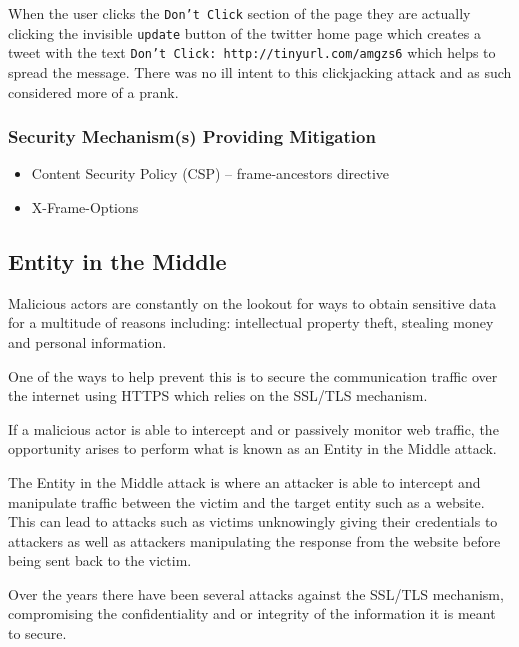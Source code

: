 \documentclass{mscreport}
\begin{document}
\vspace{0.3cm} \noindent
When the user clicks the \texttt{Don't Click} section of the page they are actually clicking the invisible \texttt{update} button of the twitter home page which creates a tweet with the text \texttt{Don’t Click: http://tinyurl.com/amgzs6} \cite{Jani2015-kw} which helps to spread the message. There was no ill intent to this clickjacking attack and as such considered more of a prank.
\subsubsection{Security Mechanism(s) Providing Mitigation}

\begin{itemize}
	\setlength\itemsep{0.1em}
	\item Content Security Policy (CSP) – frame-ancestors directive
	\item X-Frame-Options
\end{itemize}

\subsection{Entity in the Middle}
\label{subsection:entity_in_the_middle}

Malicious actors are constantly on the lookout for ways to obtain sensitive data for a multitude of reasons including: intellectual property theft, stealing money and personal information.

\vspace{0.3cm} \noindent
One of the ways to help prevent this is to secure the communication traffic over the internet using HTTPS which relies on the SSL/TLS mechanism.

\vspace{0.3cm} \noindent
If a malicious actor is able to intercept and or passively monitor web traffic, the opportunity arises to perform what is known as an Entity in the Middle attack.

\vspace{0.3cm} \noindent
The Entity in the Middle attack is where an attacker is able to intercept and manipulate traffic between the victim and the target entity such as a website. This can lead to attacks such as victims unknowingly giving their credentials to attackers as well as attackers manipulating the response from the website before being sent back to the victim.

\vspace{0.3cm} \noindent
Over the years there have been several attacks against the SSL/TLS mechanism, compromising the confidentiality and or integrity of the information it is meant to secure.
\end{document}
